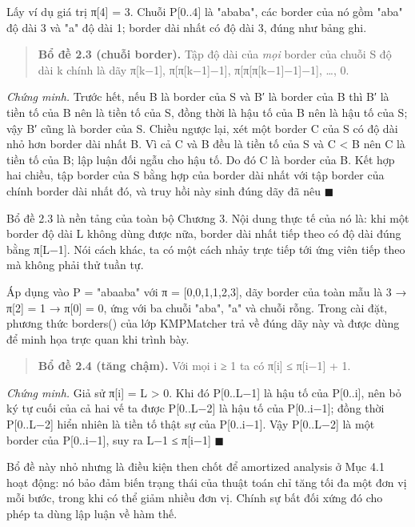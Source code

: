 Lấy ví dụ giá trị π{[}4{]} = 3. Chuỗi P{[}0..4{]} là "ababa", các border
của nó gồm "aba" độ dài 3 và "a" độ dài 1; border dài nhất có độ dài 3,
đúng như bảng ghi.

\begin{quote}
\textbf{Bổ đề 2.3 (chuỗi border).} Tập độ dài của \emph{mọi} border của
chuỗi S độ dài k chính là dãy π{[}k−1{]}, π{[}π{[}k−1{]}−1{]},
π{[}π{[}π{[}k−1{]}−1{]}−1{]}, \ldots, 0.
\end{quote}

\emph{Chứng minh.} Trước hết, nếu B là border của S và B′ là border của
B thì B′ là tiền tố của B nên là tiền tố của S, đồng thời là hậu tố của
B nên là hậu tố của S; vậy B′ cũng là border của S. Chiều ngược lại, xét
một border C của S có độ dài nhỏ hơn border dài nhất B. Vì cả C và B đều
là tiền tố của S và \textbar C\textbar{} \textless{}
\textbar B\textbar{} nên C là tiền tố của B; lập luận đối ngẫu cho hậu
tố. Do đó C là border của B. Kết hợp hai chiều, tập border của S bằng
hợp của border dài nhất với tập border của chính border dài nhất đó, và
truy hồi này sinh đúng dãy đã nêu \(\blacksquare\)

Bổ đề 2.3 là nền tảng của toàn bộ Chương 3. Nội dung thực tế của nó là:
khi một border độ dài L không dùng được nữa, border dài nhất tiếp theo
có độ dài đúng bằng π{[}L−1{]}. Nói cách khác, ta có một cách nhảy trực
tiếp tới ứng viên tiếp theo mà không phải thử tuần tự.

Áp dụng vào P = "abaaba" với π = {[}0,0,1,1,2,3{]}, dãy border của toàn
mẫu là 3 → π{[}2{]} = 1 → π{[}0{]} = 0, ứng với ba chuỗi "aba", "a" và
chuỗi rỗng. Trong cài đặt, phương thức borders() của lớp KMPMatcher trả
về đúng dãy này và được dùng để minh họa trực quan khi trình bày.

\begin{quote}
\textbf{Bổ đề 2.4 (tăng chậm).} Với mọi i ≥ 1 ta có π{[}i{]} ≤
π{[}i−1{]} + 1.
\end{quote}

\emph{Chứng minh.} Giả sử π{[}i{]} = L \textgreater{} 0. Khi đó
P{[}0..L−1{]} là hậu tố của P{[}0..i{]}, nên bỏ ký tự cuối của cả hai vế
ta được P{[}0..L−2{]} là hậu tố của P{[}0..i−1{]}; đồng thời
P{[}0..L−2{]} hiển nhiên là tiền tố thật sự của P{[}0..i−1{]}. Vậy
P{[}0..L−2{]} là một border của P{[}0..i−1{]}, suy ra L−1 ≤ π{[}i−1{]} \(\blacksquare\)

Bổ đề này nhỏ nhưng là điều kiện then chốt để amortized analysis ở Mục
4.1 hoạt động: nó bảo đảm biến trạng thái của thuật toán chỉ tăng tối đa
một đơn vị mỗi bước, trong khi có thể giảm nhiều đơn vị. Chính sự bất
đối xứng đó cho phép ta dùng lập luận về hàm thế.

